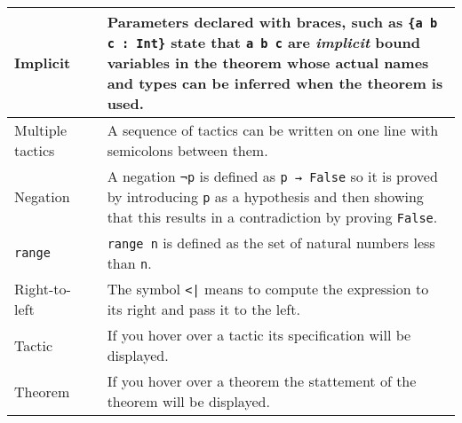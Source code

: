 \begin{tabular}{p{}|r|p{}}
Implicit&\pageref{p.implicit}&Parameters declared with braces, such as \Verb+{a b c : Int}+ state that \Verb+a b c+ are \emph{implicit} bound variables in the theorem whose actual names and types can be inferred when the theorem is used.\\\hline

Multiple tactics& \pageref{p.multiple}&A sequence of tactics can be written on one line with semicolons between them.\\\hline

Negation&\pageref{p.negation}&A negation \Verb+¬p+ is defined as \Verb+p → False+ so it is proved by introducing \Verb+p+ as a hypothesis and then showing that this results in a contradiction by proving \Verb+False+.\\\hline

\Verb+range+&\pageref{p.range}&\Verb+range n+ is defined as the set of natural numbers less than \Verb+n+.\\\hline

Right-to-left&\pageref{p.right-to-left}&The symbol \Verb+<|+ means to compute the expression to its right and pass it to the left.\\\hline

Tactic&\pageref{p.tactic}&If you hover over a tactic its specification will be displayed.\\\hline

Theorem&\pageref{p.theorem}&If you hover over a theorem the stattement of the theorem will be displayed.\\\hline

\end{tabular}

